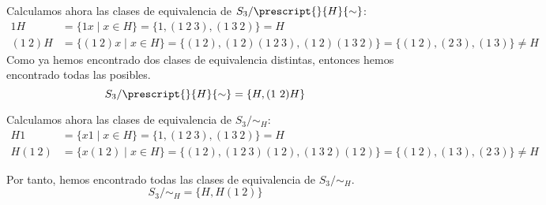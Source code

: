 \begin{ejercicio}
\begin{enumerate}
        Calculamos ahora las clases de equivalencia de $S_3/\prescript{}{H}{\sim}$:
        \begin{align*}
            1H &= \{1x\mid x\in H\} = \{1, (1\ 2\ 3), (1\ 3\ 2)\} = H\\
            (1\ 2)H &= \{(1\ 2)x\mid x\in H\} = \{(1\ 2), (1\ 2)(1\ 2\ 3), (1\ 2)(1\ 3\ 2)\} = \{(1\ 2), (2\ 3), (1\ 3)\}\neq H
        \end{align*}
        Como ya hemos encontrado dos clases de equivalencia distintas, entonces hemos encontrado todas las posibles.
        \begin{equation*}
            S_3/\prescript{}{H}{\sim} = \{H, (1\ 2)H\}
        \end{equation*}

        Calculamos ahora las clases de equivalencia de $S_3/\sim_H$:
        \begin{align*}
            H1 &= \{x1\mid x\in H\} = \{1, (1\ 2\ 3), (1\ 3\ 2)\} = H\\
            H(1\ 2) &= \{x(1\ 2)\mid x\in H\} = \{(1\ 2), (1\ 2\ 3)(1\ 2), (1\ 3\ 2)(1\ 2)\} = \{(1\ 2), (1\ 3), (2\ 3)\}\neq H
        \end{align*}

        Por tanto, hemos encontrado todas las clases de equivalencia de $S_3/\sim_H$.
        \begin{equation*}
            S_3/\sim_H = \{H, H(1\ 2)\}
        \end{equation*}
    \end{enumerate}
\end{ejercicio}

